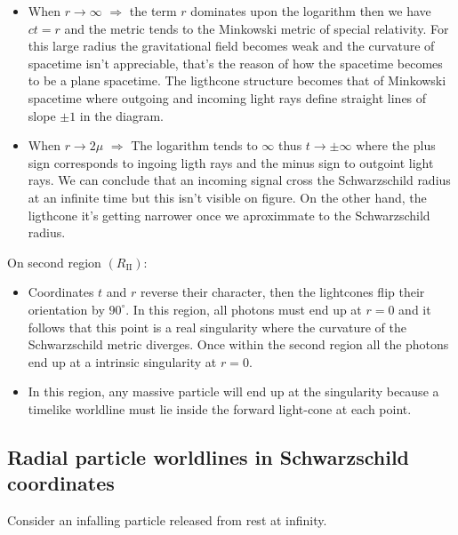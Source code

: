 \documentclass[letterpaper,11pt,onecolumn]{article}
\begin{document}
\begin{itemize}
\item When $r\rightarrow \infty$ $\Rightarrow$ the term $r$ dominates upon the logarithm then we have $ct=r$ and the metric tends to the Minkowski metric of special relativity. For this large radius the gravitational field becomes weak and the curvature of spacetime isn't appreciable, that's the reason of how the spacetime becomes to be a plane spacetime. The ligthcone structure becomes that of Minkowski spacetime where outgoing and incoming light rays define straight lines of slope $\pm1$ in the diagram.

\item When $r\rightarrow 2\mu$ $\Rightarrow$ The logarithm tends to $\infty$ thus $t\rightarrow \pm\infty$ where the plus sign corresponds to ingoing ligth rays and the minus sign to outgoint light rays. We can conclude that an incoming signal cross the Schwarzschild radius at an infinite time but this isn't visible on figure. On the other hand, the ligthcone it's getting narrower once we aproximmate to the Schwarzschild radius.

\end{itemize}
On second region $(R_{\mathrm{II}})$:
\begin{itemize}
  \item  Coordinates $t$ and $r$ reverse their character, then the lightcones flip their orientation by $90^{\circ}$. In this region, all photons must end up at $r=0$ and it follows that this point is a real singularity where the curvature of the Schwarzschild metric diverges. Once within the second region  all the photons end up at a intrinsic singularity at $r=0$.
  \item In this region, any massive particle
will end up at the singularity because a timelike worldline must lie inside the forward light-cone at each point.

\end{itemize}
\subsection{Radial particle worldlines in Schwarzschild coordinates}

Consider an infalling particle released from rest at infinity.
\end{document}
